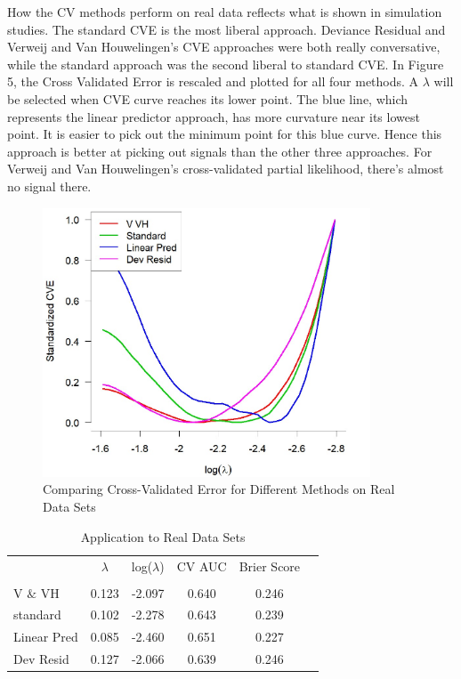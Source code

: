 \par How the CV methods perform on real data reflects what is shown in simulation studies. The standard CVE is the most liberal approach. Deviance Residual and Verweij and Van Houwelingen's CVE approaches were both really conversative, while the standard approach was the second liberal to standard CVE. In Figure 5, the Cross Validated Error is rescaled and plotted for all four methods. A $\lambda$ will be selected when CVE curve reaches its lower point. The blue line, which represents the linear predictor approach, has more curvature near its lowest point. It is easier to pick out the minimum point for this blue curve. Hence this approach is better at picking out signals than the other three approaches. For Verweij and Van Houwelingen's cross-validated partial likelihood, there's almost no signal there.

\begin{figure}[h]
    \centering
		\includegraphics[height= 8cm ]{./figures/shedden.jpg}
    \caption{Comparing Cross-Validated Error for Different Methods on Real Data Sets}
\end{figure}	

\begin{table}[h]
\centering
\caption{Application to Real Data Sets}
\label{my-label}
\begin{tabular}{lccccc}
\toprule
						& $\lambda$ & log($\lambda$) & CV AUC & Brier Score \\ 
						\cline{2-5} \\ 
						V $\&$ VH& 0.123 & -2.097 & 0.640 & 0.246\\
						standard & 0.102 & -2.278 & 0.643& 0.239\\
						Linear Pred &0.085 & -2.460 & 0.651&  0.227\\
						Dev Resid & 0.127& -2.066 & 0.639& 0.246\\ 
						\bottomrule
\end{tabular}
\end{table}

